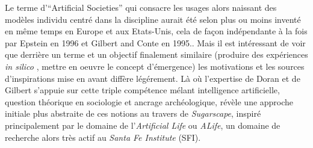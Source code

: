 


Le terme d'\foreignquote{english}{Artificial Societies}  qui consacre les usages alors naissant des modèles individu centré dans la discipline aurait été selon \textcite{Gilbert2000a} plus ou moins inventé en même temps en Europe et aux Etats-Unis, cela de façon indépendante à la fois par Epstein en 1996 et Gilbert and Conte en 1995.. Mais il est intéressant de voir que derrière un terme et un objectif finalement similaire (produire des expériences \textit{in silico} , mettre en oeuvre le concept d'émergence) les motivations et les sources d'inspirations mise en avant diffère légérement. Là où l'expertise de Doran et de Gilbert s'appuie sur cette triple compétence mélant intelligence artificielle, question théorique en sociologie et ancrage archéologique,  \autocite[17-19]{Epstein1996} révèle une approche initiale plus abstraite de ces notions au travers de \textit{Sugarscape}, inspiré principalement par le domaine de l'\textit{Artificial Life} ou \textit{ALife}, un domaine de recherche alors très actif au \textit{Santa Fe Institute} (SFI).


